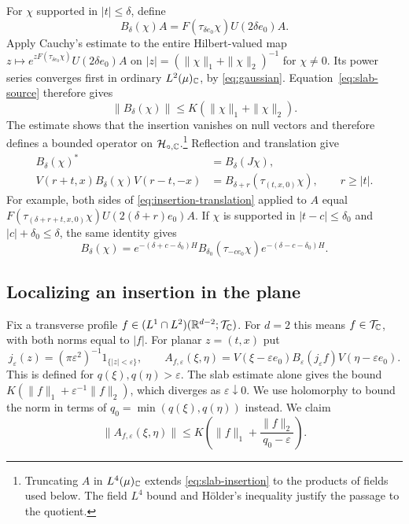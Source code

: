 For $\chi$ supported in $|t|\leq\delta$, define
\begin{equation}\label{eq:slab-insertion}
 B_\delta(\chi)A=F(\tau_{\delta e_0}\chi)U(2\delta e_0)A.
\end{equation}
Apply Cauchy's estimate to the entire Hilbert-valued map
$z\mapsto e^{zF(\tau_{\delta e_0}\chi)}U(2\delta e_0)A$ on
$|z|=(\|\chi\|_1+\|\chi\|_2)^{-1}$ for $\chi\neq0$. Its power
series converges first in ordinary $L^2(\mu)_{\mathbb{C}}$, by
\eqref{eq:gaussian}. Equation~\eqref{eq:slab-source}
therefore gives
\begin{equation}\label{eq:insertion-bound}
 \|B_\delta(\chi)\|\leq K(\|\chi\|_1+\|\chi\|_2).
\end{equation}
The estimate shows that the insertion vanishes on null vectors and
therefore defines a bounded operator on $\mathcal{H}_{\circ,\mathbb{C}}$.\footnote{Truncating $A$ in $L^4(\mu)_{\mathbb{C}}$ extends
\eqref{eq:slab-insertion} to the products of fields used below.
The field $L^4$ bound and H\"older's inequality justify the passage
to the quotient.}
Reflection and translation give
\begin{align}
 B_\delta(\chi)^*&=B_\delta(J\chi),\label{eq:insertion-adjoint}\\
 V(r+t,x)B_\delta(\chi)V(r-t,-x)
   &=B_{\delta+r}(\tau_{(t,x,0)}\chi),\qquad r\geq|t|.
 \label{eq:insertion-translation}
\end{align}
For example, both sides of \eqref{eq:insertion-translation} applied to
$A$ equal
$F(\tau_{(\delta+r+t,x,0)}\chi)U(2(\delta+r)e_0)A$.
If $\chi$ is supported in $|t-c|\leq\delta_0$ and
$|c|+\delta_0\leq\delta$, the same identity gives
\begin{equation}\label{eq:insertion-localization}
 B_\delta(\chi)=e^{-(\delta+c-\delta_0)H}
 B_{\delta_0}(\tau_{-ce_0}\chi)e^{-(\delta-c-\delta_0)H}.
\end{equation}

\subsection{Localizing an insertion in the plane}\label{subsec:point}

Fix a transverse profile $f\in(L^1\cap L^2)(\mathbb{R}^{d-2};\mathcal{T}_{\mathbb{C}})$.
For $d=2$ this means $f\in\mathcal{T}_{\mathbb{C}}$, with both norms equal to $|f|$.
For planar $z=(t,x)$ put
\begin{equation}
 j_\varepsilon(z)=(\pi\varepsilon^2)^{-1}1_{\{|z|<\varepsilon\}},
 \qquad
 A_{f,\varepsilon}(\xi,\eta)
 =V(\xi-\varepsilon e_0)B_\varepsilon(j_\varepsilon f)
     V(\eta-\varepsilon e_0).
\end{equation}
This is defined for $q(\xi),q(\eta)>\varepsilon$. The slab estimate
alone gives the bound $K(\|f\|_1+\varepsilon^{-1}\|f\|_2)$, which diverges as
$\varepsilon\downarrow0$. We use holomorphy to bound the norm in terms
of $q_0=\min(q(\xi),q(\eta))$ instead. We claim
\begin{equation}\label{eq:regularized-point-bound}
 \|A_{f,\varepsilon}(\xi,\eta)\|
       \leq K\left(\|f\|_1+\frac{\|f\|_2}{q_0-\varepsilon}\right).
\end{equation}

